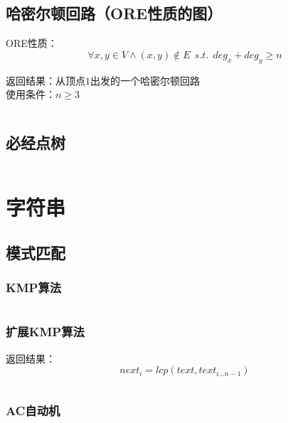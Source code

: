 \documentclass[landscape, twoside, a4paper]{article}
\newcommand{\cppcode}[1]{
	\inputminted[mathescape,
	frame=lines,linenos]{cpp}{source/#1}
}
\begin{document}
\begin{multicols}{2}
\begin{spacing}{0.8}




\subsection{哈密尔顿回路（ORE性质的图）}


ORE性质：$$\forall x,y \in V \wedge (x,y) \notin E \ \ s.t. \ \ deg_x+deg_y \geq n$$

\indent 返回结果：从顶点$1$出发的一个哈密尔顿回路\\

\indent 使用条件：$n \geq 3$


\cppcode{graph-theory/hamiltonian-circuit-ore.cpp}


\subsection{必经点树}

\cppcode{graph-theory/dominator-tree.cpp}


\section{字符串}


\subsection{模式匹配}


\subsubsection{KMP算法}


\cppcode{string-manipulation/KMP.cpp}


\subsubsection{扩展KMP算法}


返回结果：$$next_i = lcp(text, text_{i \dots n-1})$$


\cppcode{string-manipulation/ExtKMP.cpp}


\subsubsection{AC自动机}



\end{spacing}
\end{multicols}
\end{document}
